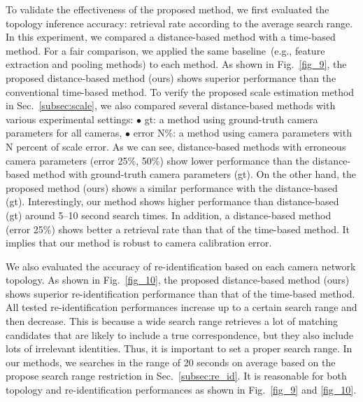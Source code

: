 \documentclass[10pt,twocolumn,letterpaper]{article}
\begin{document}
		To validate the effectiveness of the proposed method, we first evaluated the topology inference accuracy: retrieval rate according to the average search range.
		In this experiment, we compared a distance-based method with a time-based method. For a fair comparison, we applied the same baseline~(e.g., feature extraction and pooling methods) to each method.
		As shown in Fig.~\ref{fig_9}, the proposed distance-based method (ours) shows superior performance than the conventional time-based method.
		To verify the proposed scale estimation method in Sec.~\ref{subsec:scale}, we also compared several distance-based methods with various experimental settings: $\bullet$ gt: a method using ground-truth camera parameters for all cameras, $\bullet$ error N\%: a method using camera parameters with N percent of scale error.
		As we can see, distance-based methods with erroneous camera parameters (error 25\%, 50\%) show lower performance than the distance-based method with ground-truth camera parameters (gt).	
		On the other hand, the proposed method (ours) shows a similar performance with the distance-based (gt).
		Interestingly, our method shows higher performance than distance-based (gt) around 5--10 second search times.
		In addition, a distance-based method (error 25\%) shows better a retrieval rate than that of the time-based method.
		It implies that our method is robust to camera calibration error.
		
		
		
		We also evaluated the accuracy of re-identification based on each camera network topology.
		As shown in Fig.~\ref{fig_10}, the proposed distance-based method (ours) shows superior re-identification performance than that of the time-based method. 
		All tested re-identification performances increase up to a certain search range and then decrease. This is because a wide search range retrieves a lot of matching candidates that are likely to include a true correspondence, but they also include lots of irrelevant identities. 
		Thus, it is important to set a proper search range.
		In our methods, we searches in the range of 20 seconds on average based on the propose search range restriction in Sec.~\ref{subsec:re_id}.
		It is reasonable for both topology and re-identification performances as shown in Fig.~\ref{fig_9} and \ref{fig_10}.
		
		
		
\end{document}

